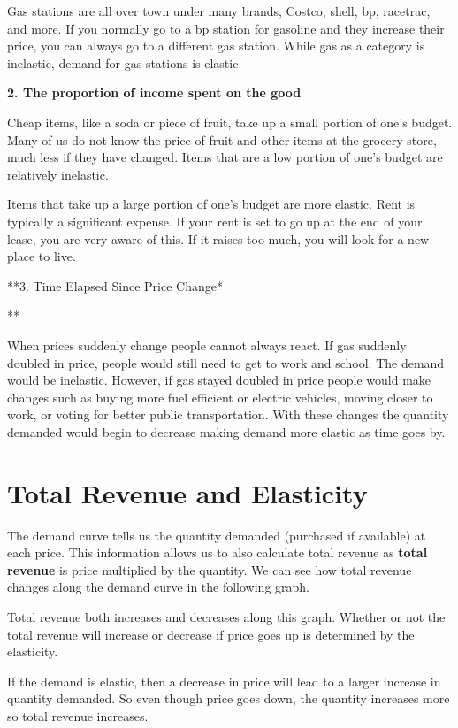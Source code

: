 \documentclass[
]{book}
\begin{document}
Gas stations are all over town under many brands, Costco, shell, bp, racetrac, and more. If you normally go to a bp station for gasoline and they increase their price, you can always go to a different gas station. While gas as a category is inelastic, demand for gas stations is elastic.

\textbf{2. The proportion of income spent on the good}

Cheap items, like a soda or piece of fruit, take up a small portion of one's budget. Many of us do not know the price of fruit and other items at the grocery store, much less if they have changed. Items that are a low portion of one's budget are relatively inelastic.

Items that take up a large portion of one's budget are more elastic. Rent is typically a significant expense. If your rent is set to go up at the end of your lease, you are very aware of this. If it raises too much, you will look for a new place to live.

**3. Time Elapsed Since Price Change*

**

When prices suddenly change people cannot always react. If gas suddenly doubled in price, people would still need to get to work and school. The demand would be inelastic. However, if gas stayed doubled in price people would make changes such as buying more fuel efficient or electric vehicles, moving closer to work, or voting for better public transportation. With these changes the quantity demanded would begin to decrease making demand more elastic as time goes by.

\section{Total Revenue and Elasticity}\label{total-revenue-and-elasticity}

The demand curve tells us the quantity demanded (purchased if available) at each price. This information allows us to also calculate total revenue as \textbf{total revenue} is price multiplied by the quantity. We can see how total revenue changes along the demand curve in the following graph.

Total revenue both increases and decreases along this graph. Whether or not the total revenue will increase or decrease if price goes up is determined by the elasticity.

If the demand is elastic, then a decrease in price will lead to a larger increase in quantity demanded. So even though price goes down, the quantity increases more so total revenue increases.
\end{document}
